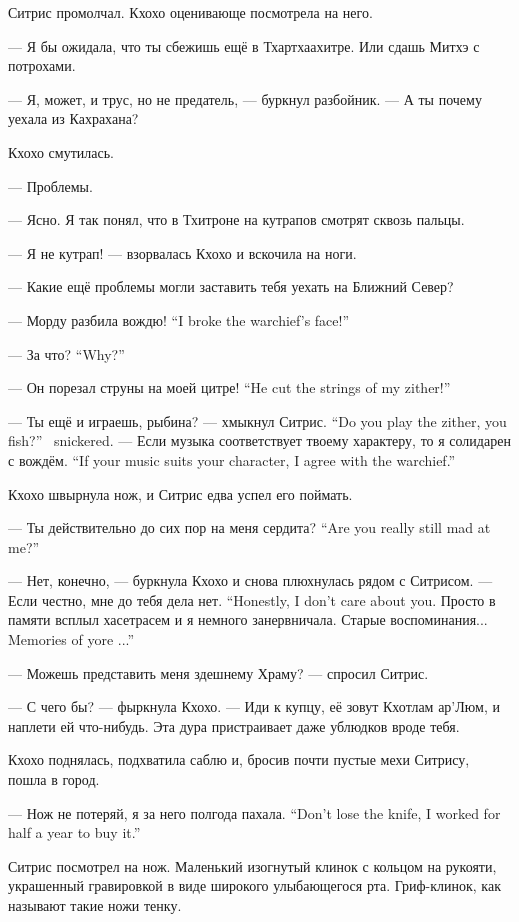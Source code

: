 Ситрис промолчал.
Кхохо оценивающе посмотрела на него.

--- Я бы ожидала, что ты сбежишь ещё в Тхартхаахитре.
Или сдашь Митхэ с потрохами.

--- Я, может, и трус, но не предатель, --- буркнул разбойник.
--- А ты почему уехала из Кахрахана?

Кхохо смутилась.

--- Проблемы.

--- Ясно.
Я так понял, что в Тхитроне на кутрапов смотрят сквозь пальцы.

--- Я не кутрап! --- взорвалась Кхохо и вскочила на ноги.

--- Какие ещё проблемы могли заставить тебя уехать на Ближний Север?

{--- Морду разбила вождю!}
{``I broke the warchief's face!''}

{--- За что?}
{``Why?''}

{--- Он порезал струны на моей цитре!}
{``He cut the strings of my zither!''}

{--- Ты ещё и играешь, рыбина? --- хмыкнул Ситрис.}
{``Do you play the zither, you fish?'' \Sitris\ snickered.}
{--- Если музыка соответствует твоему характеру, то я солидарен с вождём.}
{``If your music suits your character, I agree with the warchief.''}

Кхохо швырнула нож, и Ситрис едва успел его поймать.

{--- Ты действительно до сих пор на меня сердита?}
{``Are you really still mad at me?''}

--- Нет, конечно, --- буркнула Кхохо и снова плюхнулась рядом с Ситрисом.
{--- Если честно, мне до тебя дела нет.}
{``Honestly, I don't care about you.}
Просто в памяти всплыл хасетрасем и я немного занервничала.
{Старые воспоминания...}
{Memories of yore ...''}

--- Можешь представить меня здешнему Храму? --- спросил Ситрис.

--- С чего бы? --- фыркнула Кхохо.
--- Иди к купцу, её зовут Кхотлам ар'Люм, и наплети ей что-нибудь.
Эта дура пристраивает даже ублюдков вроде тебя.

Кхохо поднялась, подхватила саблю и, бросив почти пустые мехи Ситрису, пошла в город.

{--- Нож не потеряй, я за него полгода пахала.}
{``Don't lose the knife, I worked for half a year to buy it.''}

Ситрис посмотрел на нож.
Маленький изогнутый клинок с кольцом на рукояти, украшенный гравировкой в виде широкого улыбающегося рта.
Гриф-клинок, как называют такие ножи тенку.

